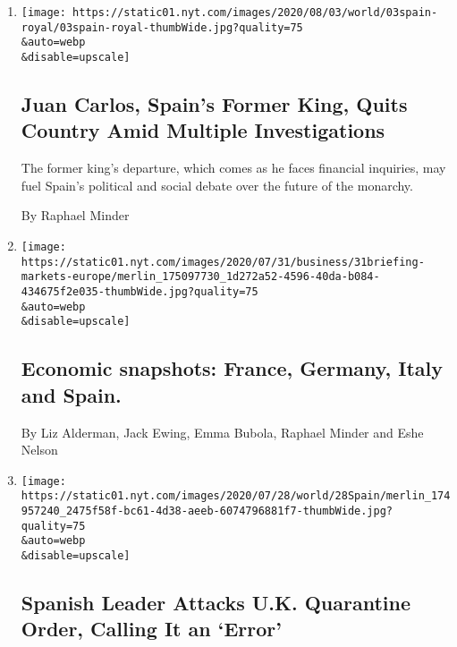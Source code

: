 \begin{enumerate}
\def\labelenumi{\arabic{enumi}.}
\item
  \href{/2020/08/03/world/europe/juan-carlos-leaves-spain.html}{}

  \texttt{[image: https://static01.nyt.com/images/2020/08/03/world/03spain-royal/03spain-royal-thumbWide.jpg?quality=75\\\&auto=webp\\\&disable=upscale]}

  \hypertarget{juan-carlos-spains-former-king-quits-country-amid-multiple-investigations}{%
  \subsection{Juan Carlos, Spain's Former King, Quits Country Amid
  Multiple
  Investigations}\label{juan-carlos-spains-former-king-quits-country-amid-multiple-investigations}}

  The former king's departure, which comes as he faces financial
  inquiries, may fuel Spain's political and social debate over the
  future of the monarchy.

  By Raphael Minder
\item
  \href{/live/2020/07/31/business/stock-market-today-coronavirus/economic-snapshots-france-germany-italy-and-spain}{}

  \texttt{[image: https://static01.nyt.com/images/2020/07/31/business/31briefing-markets-europe/merlin\_175097730\_1d272a52-4596-40da-b084-434675f2e035-thumbWide.jpg?quality=75\\\&auto=webp\\\&disable=upscale]}

  \hypertarget{economic-snapshots-france-germany-italy-and-spain}{%
  \subsection{Economic snapshots: France, Germany, Italy and
  Spain.}\label{economic-snapshots-france-germany-italy-and-spain}}

  By Liz Alderman, Jack Ewing, Emma Bubola, Raphael Minder and Eshe
  Nelson
\item
  \href{/2020/07/28/world/europe/spain-britain-quarantine-order.html}{}

  \texttt{[image: https://static01.nyt.com/images/2020/07/28/world/28Spain/merlin\_174957240\_2475f58f-bc61-4d38-aeeb-6074796881f7-thumbWide.jpg?quality=75\\\&auto=webp\\\&disable=upscale]}

  \hypertarget{spanish-leader-attacks-uk-quarantine-order-calling-it-an-error}{%
  \subsection{Spanish Leader Attacks U.K. Quarantine Order, Calling It
  an
  `Error'}\label{spanish-leader-attacks-uk-quarantine-order-calling-it-an-error}}


\end{enumerate}
